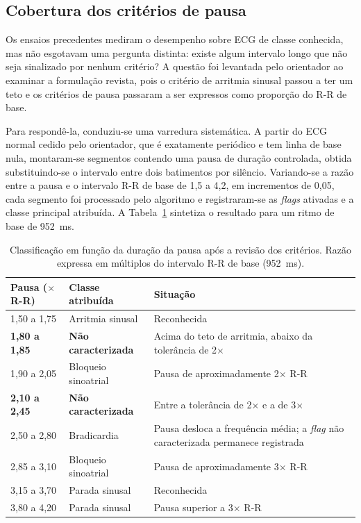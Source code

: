 \subsection{Cobertura dos critérios de pausa}
\label{sec:resZonaMorta}

Os ensaios precedentes mediram o desempenho sobre \acs{ECG} de classe conhecida, mas não esgotavam uma pergunta distinta: existe algum intervalo longo que não seja sinalizado por nenhum critério? A questão foi levantada pelo orientador ao examinar a formulação revista, pois o critério de arritmia sinusal passou a ter um teto e os critérios de pausa passaram a ser expressos como proporção do R-R de base.

Para respondê-la, conduziu-se uma varredura sistemática. A partir do \acs{ECG} normal cedido pelo orientador, que é exatamente periódico e tem linha de base nula, montaram-se segmentos contendo uma pausa de duração controlada, obtida substituindo-se o intervalo entre dois batimentos por silêncio. Variando-se a razão entre a pausa e o intervalo R-R de base de 1,5 a 4,2, em incrementos de 0,05, cada segmento foi processado pelo algoritmo e registraram-se as \textit{flags} ativadas e a classe principal atribuída. A Tabela~\ref{tab:zonaMorta} sintetiza o resultado para um ritmo de base de 952~ms.

\begin{table}[htb]
\centering
\caption{Classificação em função da duração da pausa após a revisão dos critérios. Razão expressa em múltiplos do intervalo R-R de base (952~ms).}
\label{tab:zonaMorta}
\begin{tabular}{@{}l l p{7.4cm}@{}}
\hline
\textbf{Pausa ($\times$ R-R)} & \textbf{Classe atribuída} & \textbf{Situação} \\
\hline
1,50 a 1,75 & Arritmia sinusal & Reconhecida \\
\textbf{1,80 a 1,85} & \textbf{Não caracterizada} & Acima do teto de arritmia, abaixo da tolerância de 2$\times$ \\
1,90 a 2,05 & Bloqueio sinoatrial & Pausa de aproximadamente 2$\times$ R-R \\
\textbf{2,10 a 2,45} & \textbf{Não caracterizada} & Entre a tolerância de 2$\times$ e a de 3$\times$ \\
2,50 a 2,80 & Bradicardia & Pausa desloca a frequência média; a \textit{flag} não caracterizada permanece registrada \\
2,85 a 3,10 & Bloqueio sinoatrial & Pausa de aproximadamente 3$\times$ R-R \\
3,15 a 3,70 & Parada sinusal & Reconhecida \\
3,80 a 4,20 & Parada sinusal & Pausa superior a 3$\times$ R-R \\
\hline
\end{tabular}
\end{table}

